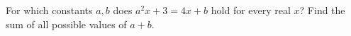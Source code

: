 For which constants $a,b$ does $a^2x+3=4x+b$ hold for every real $x$? Find the sum of all possible values of $a+b$.
